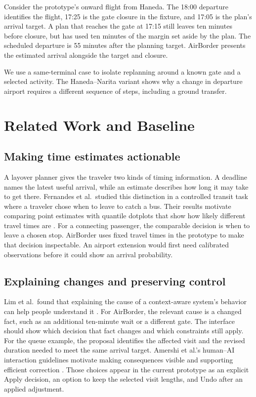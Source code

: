 \documentclass[sigconf,nonacm,balance=false]{acmart}
\begin{document}
Consider the prototype's onward flight from Haneda. The 18:00 departure identifies the flight, 17:25 is the gate closure in the fixture, and 17:05 is the plan's arrival target. A plan that reaches the gate at 17:15 still leaves ten minutes before closure, but has used ten minutes of the margin set aside by the plan. The scheduled departure is 55 minutes after the planning target. AirBorder presents the estimated arrival alongside the target and closure.

We use a same-terminal case to isolate replanning around a known gate and a selected activity. The Haneda--Narita variant shows why a change in departure airport requires a different sequence of steps, including a ground transfer.

\section{Related Work and Baseline}\label{sec:baseline}

\subsection{Making time estimates actionable}
A layover planner gives the traveler two kinds of timing information. A deadline names the latest useful arrival, while an estimate describes how long it may take to get there. Fernandes et al.\ studied this distinction in a controlled transit task where a traveler chose when to leave to catch a bus. Their results motivate comparing point estimates with quantile dotplots that show how likely different travel times are \cite{ref8}. For a connecting passenger, the comparable decision is when to leave a chosen stop. AirBorder uses fixed travel times in the prototype to make that decision inspectable. An airport extension would first need calibrated observations before it could show an arrival probability.

\subsection{Explaining changes and preserving control}
Lim et al.\ found that explaining the cause of a context-aware system's behavior can help people understand it \cite{ref7}. For AirBorder, the relevant cause is a changed fact, such as an additional ten-minute wait or a different gate. The interface should show which decision that fact changes and which constraints still apply. For the queue example, the proposal identifies the affected visit and the revised duration needed to meet the same arrival target. Amershi et al.'s human--AI interaction guidelines motivate making consequences visible and supporting efficient correction \cite{ref144}. Those choices appear in the current prototype as an explicit Apply decision, an option to keep the selected visit lengths, and Undo after an applied adjustment.
\end{document}
